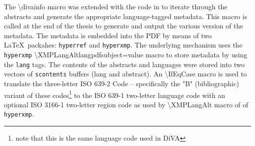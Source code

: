 The \textbackslash divainfo macro was extended with the code in  to iterate through the abstracts and generate the appropriate language-tagged metadata. This macro is called at the end of the thesis to generate and output the various version of the metadata. The metadata is embedded into the PDF by means of two \LaTeX~packahes: \texttt{hyperref} and \texttt{hyperxmp}. The underlying mechanism uses the \texttt{hyperxmp} \textbackslash XMPLangAlt{lang}{pdfsubject=value} macro to store metadata by using the \texttt{lang} tags. The contents of the abstracts and languages were stored into two vectors of \texttt{scontents} buffers (lang and abstract). An \textbackslash IfEqCase macro is used to translate the three-letter ISO 639-2 Code – specifically the "B" (bibliographic) variant of these codes\footnote{note that this is the same language code used in DiVA} to the ISO 639-1 two-letter language code with an optional ISO 3166-1 two-letter region code as used by \textbackslash XMPLangAlt macro of of \texttt{hyperxmp}.
